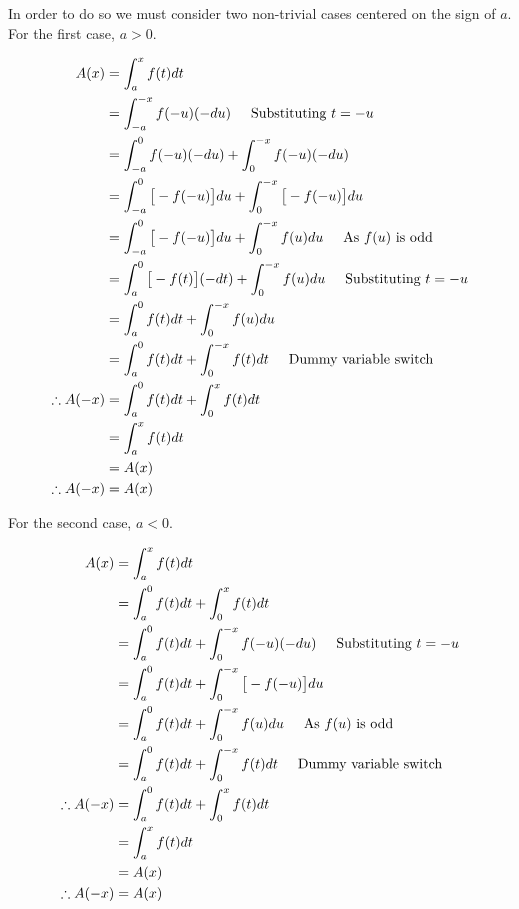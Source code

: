 In order to do so we must consider two non-trivial cases centered on the sign of $a$. For the first case, $\displaystyle{a>0}$.

		\begin{align*}
		A(x) & = \int_{a}^{x}f(t)dt\\
		& = \int_{-a}^{-x}f(-u)(-du) \hspace{5mm} \text{Substituting $t = -u$}\\
		& = \int_{-a}^{0}f(-u)(-du) + \int_{0}^{-x}f(-u)(-du)\\
		& = \int_{-a}^{0}\big[-f(-u)\big]du + \int_{0}^{-x}\big[-f(-u)\big]du\\
		& = \int_{-a}^{0}\big[-f(-u)\big]du + \int_{0}^{-x}f(u)du \hspace{5mm} \text{As $\displaystyle{f(u)}$ is odd}\\
		& = \int_{a}^{0}\big[-f(t)\big](-dt) + \int_{0}^{-x}f(u)du \hspace{5mm} \text{Substituting $t = -u$}\\
		& = \int_{a}^{0}f(t)dt + \int_{0}^{-x}f(u)du\\
		& = \int_{a}^{0}f(t)dt + \int_{0}^{-x}f(t)dt \hspace{5mm} \text{Dummy variable switch}\\
		\therefore A(-x) & = \int_{a}^{0}f(t)dt + \int_{0}^{x}f(t)dt\\
		& = \int_{a}^{x}f(t)dt\\
		& = A(x)\\
		\therefore A(-x) & = A(x)\\
		\end{align*}

		For the second case, $\displaystyle{a<0}$.

		\begin{align*}
		A(x) & = \int_{a}^{x}f(t)dt\\
		& = \int_{a}^{0}f(t)dt + \int_{0}^{x}f(t)dt\\
		& = \int_{a}^{0}f(t)dt + \int_{0}^{-x}f(-u)(-du) \hspace{5mm} \text{Substituting $t = -u$}\\
		& = \int_{a}^{0}f(t)dt + \int_{0}^{-x}\big[-f(-u)\big]du\\
		& = \int_{a}^{0}f(t)dt + \int_{0}^{-x}f(u)du \hspace{5mm} \text{As $\displaystyle{f(u)}$ is odd}\\
		& = \int_{a}^{0}f(t)dt + \int_{0}^{-x}f(t)dt \hspace{5mm} \text{Dummy variable switch}\\
		\therefore A(-x) & = \int_{a}^{0}f(t)dt + \int_{0}^{x}f(t)dt\\
		& = \int_{a}^{x}f(t)dt\\
		& = A(x)\\
		\therefore A(-x) & = A(x)\\
		\end{align*}


